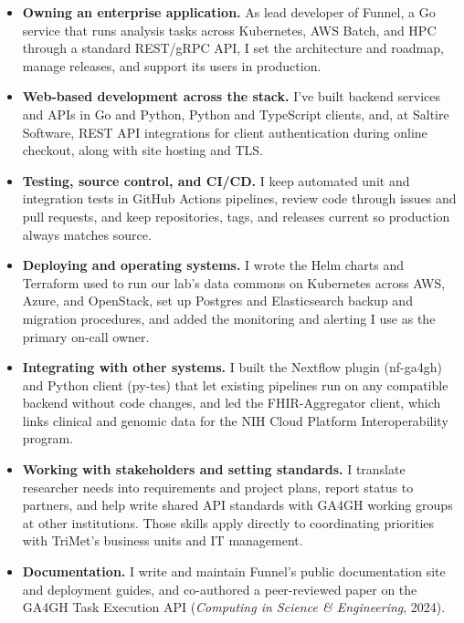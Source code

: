 \begin{itemize}[itemsep=0pt, topsep=1pt]

\item \textbf{Owning an enterprise application.} As lead developer of Funnel, a Go service that runs analysis tasks across Kubernetes, AWS Batch, and HPC through a standard REST/gRPC API, I set the architecture and roadmap, manage releases, and support its users in production.

\item \textbf{Web-based development across the stack.} I've built backend services and APIs in Go and Python, Python and TypeScript clients, and, at Saltire Software, REST API integrations for client authentication during online checkout, along with site hosting and TLS.

\item \textbf{Testing, source control, and CI/CD.} I keep automated unit and integration tests in GitHub Actions pipelines, review code through issues and pull requests, and keep repositories, tags, and releases current so production always matches source.

\item \textbf{Deploying and operating systems.} I wrote the Helm charts and Terraform used to run our lab's data commons on Kubernetes across AWS, Azure, and OpenStack, set up Postgres and Elasticsearch backup and migration procedures, and added the monitoring and alerting I use as the primary on-call owner.

\item \textbf{Integrating with other systems.} I built the Nextflow plugin (nf-ga4gh) and Python client (py-tes) that let existing pipelines run on any compatible backend without code changes, and led the FHIR-Aggregator client, which links clinical and genomic data for the NIH Cloud Platform Interoperability program.

\item \textbf{Working with stakeholders and setting standards.} I translate researcher needs into requirements and project plans, report status to partners, and help write shared API standards with GA4GH working groups at other institutions. Those skills apply directly to coordinating priorities with TriMet's business units and IT management.

\item \textbf{Documentation.} I write and maintain Funnel's public documentation site and deployment guides, and co-authored a peer-reviewed paper on the GA4GH Task Execution API (\emph{Computing in Science \& Engineering}, 2024).

\end{itemize}


